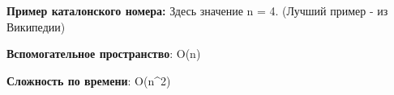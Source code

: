 \vspace{\baselineskip}
\textbf{Пример каталонского номера:}
\vspace{\baselineskip}
Здесь значение n = 4. (Лучший пример - из Википедии)

\vspace{\baselineskip}
\vspace{\baselineskip}
\textbf{Вспомогательное пространство}: O(n)


\textbf{Сложность по времени}: O(n^2)

